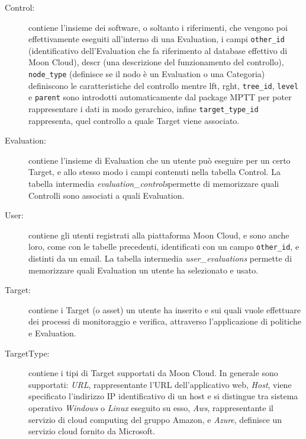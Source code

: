 \begin{description}
    \item[Control:] contiene l'insieme dei software, o soltanto i riferimenti, che vengono poi effettivamente eseguiti all'interno 
    di una Evaluation, i campi \texttt{other\_id} (identificativo dell'Evaluation che fa riferimento al database effettivo di Moon Cloud), 
    descr (una descrizione del funzionamento del controllo), \texttt{node\_type} (definisce se il nodo è un Evaluation o una Categoria) 
    definiscono le caratteristiche del controllo mentre lft, rght, \texttt{tree\_id}, \texttt{level} e \texttt{parent} sono introdotti 
    automaticamente dal package MPTT per poter rappresentare i dati in modo gerarchico, infine \texttt{target\_type\_id} rappresenta, quel 
    controllo a quale Target viene associato.
    \item[Evaluation:] contiene l'insieme di Evaluation che un utente può eseguire per un certo Target, e allo stesso modo 
    i campi contenuti nella tabella Control. La tabella intermedia \textit{evaluation\_controls}permette di memorizzare quali Controlli 
    sono associati a quali Evaluation.
    \item[User:] contiene gli utenti registrati alla piattaforma Moon Cloud, e sono anche loro, come con le tabelle precedenti, 
    identificati con un campo \texttt{other\_id}, e distinti da un email. La tabella intermedia \textit{user\_evaluations} permette di memorizzare 
    quali Evaluation un utente ha selezionato e usato.
    \item[Target:] contiene i  Target (o asset) un utente ha inserito e sui quali vuole effettuare dei processi 
    di monitoraggio e verifica, attraverso l'applicazione di politiche e Evaluation.
    \item[TargetType:] contiene i tipi di Target supportati da Moon Cloud. In generale sono supportati: \textit{URL}, 
    rappresentante l'URL dell'applicativo web, \textit{Host}, viene specificato l'indirizzo IP identificativo di un host e si distingue 
    tra sistema operativo \textit{Windows} o \textit{Linux} eseguito su esso, \textit{Aws}, rappresentante il servizio di cloud computing del 
    gruppo Amazon, e \textit{Azure}, definisce un servizio cloud fornito da Microsoft.
\end{description}
%
